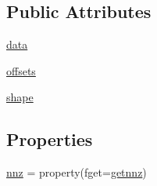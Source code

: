 \subsection*{Public Attributes}
\begin{DoxyCompactItemize}
\item 
\hyperlink{classscipy_1_1sparse_1_1dia_1_1dia__matrix_a78d05cb0f3fe0e1acbf214ec07d92ac7}{data}
\item 
\hyperlink{classscipy_1_1sparse_1_1dia_1_1dia__matrix_a8bfe11d2198fb7c967dadc0a024dde84}{offsets}
\item 
\hyperlink{classscipy_1_1sparse_1_1dia_1_1dia__matrix_a2a137f150710a5084f2e997ecb043d14}{shape}
\end{DoxyCompactItemize}
\subsection*{Properties}
\begin{DoxyCompactItemize}
\item 
\hyperlink{classscipy_1_1sparse_1_1dia_1_1dia__matrix_a8fb306755f0c1bc24ce875367322be31}{nnz} = property(fget=\hyperlink{classscipy_1_1sparse_1_1dia_1_1dia__matrix_ac9cba8a915448a44a34e5b799063fae2}{getnnz})
\end{DoxyCompactItemize}


